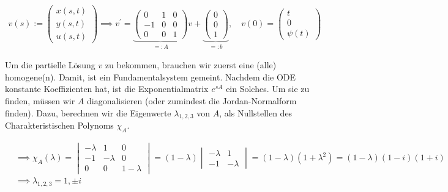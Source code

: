 \begin{solution}
\begin{align*}
    v(s)
    :=
    \begin{pmatrix}
        x(s, t) \\ y(s, t) \\ u(s, t)
    \end{pmatrix}
    \implies
    v^\prime
    =
    \underbrace
    {
        \begin{pmatrix}
             0 & 1 & 0 \\
            -1 & 0 & 0 \\
             0 & 0 & 1
        \end{pmatrix}
    }_{=: A} v
    +
    \underbrace
    {
        \begin{pmatrix}
            0 \\ 0 \\ 1
        \end{pmatrix}
    }_{=: b},
    \quad
    v(0)
    =
    \begin{pmatrix}
        t \\ 0 \\ \psi(t)
    \end{pmatrix}
\end{align*}

Um die partielle Lösung $v$ zu bekommen, brauchen wir zuerst eine (alle) homogene(n).
Damit, ist ein Fundamentalsystem gemeint.
Nachdem die ODE konstante Koeffizienten hat, ist die Exponentialmatrix $e^{sA}$ ein Solches.
Um sie zu finden, müssen wir $A$ diagonalisieren (oder zumindest die Jordan-Normalform finden).
Dazu, berechnen wir die Eigenwerte $\lambda_{1, 2, 3}$ von $A$, als Nullstellen des Charakteristischen Polynoms $\chi_A$.

\begin{align*}
    & \implies
    \chi_A(\lambda)
    =
    \begin{vmatrix}
        -\lambda &  1       & 0 \\
        -1       & -\lambda & 0 \\
         0       &  0       & 1 - \lambda
    \end{vmatrix}
    =
    (1 - \lambda)
    \begin{vmatrix}
        -\lambda & 1 \\
        -1       & -\lambda
    \end{vmatrix}
    =
    (1 - \lambda) (1 + \lambda^2)
    =
    (1 - \lambda) (1 - i) (1 + i) \\
    & \implies
    \lambda_{1, 2, 3} = 1, \pm i
\end{align*}


\end{solution}
